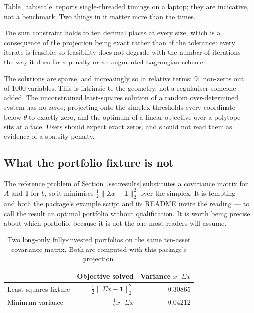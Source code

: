 \documentclass[11pt,a4paper]{article}
\begin{document}
Table~\ref{tab:scale} reports single-threaded timings on a laptop; they are
indicative, not a benchmark. Two things in it matter more than the times.

The sum constraint holds to ten decimal places at every size, which is a
consequence of the projection being exact rather than of the tolerance: every
iterate is feasible, so feasibility does not degrade with the number of
iterations the way it does for a penalty or an augmented-Lagrangian scheme.

The solutions are sparse, and increasingly so in relative terms: $91$ non-zeros
out of $1000$ variables. This is intrinsic to the geometry, not a regulariser
someone added. The unconstrained least-squares solution of a random
over-determined system has no zeros; projecting onto the simplex thresholds
every coordinate below $\theta$ to exactly zero, and the optimum of a linear
objective over a polytope sits at a face. Users should expect exact zeros, and
should not read them as evidence of a sparsity penalty.

\subsection{What the portfolio fixture is not}
\label{sec:notgmv}

The reference problem of Section~\ref{sec:results} substitutes a covariance
matrix for $A$ and $\mathbf{1}$ for $b$, so it minimises
$\tfrac{1}{2}\|\Sigma x - \mathbf{1}\|_2^2$ over the simplex. It is tempting ---
and both the package's example script and its README invite the reading --- to
call the result an optimal portfolio without qualification. It is worth being
precise about which portfolio, because it is not the one most readers will
assume.

\begin{table}[t]
\centering
\caption{Two long-only fully-invested portfolios on the same ten-asset
covariance matrix. Both are computed with this package's projection.}
\label{tab:gmv}
\begin{tabular}{lrr}
\toprule
& Objective solved & Variance $x^{\top}\Sigma x$ \\
\midrule
Least-squares fixture & $\tfrac{1}{2}\|\Sigma x - \mathbf{1}\|_2^2$ & $0.30865$ \\
Minimum variance      & $\tfrac{1}{2} x^{\top}\Sigma x$             & $0.04212$ \\
\bottomrule
\end{tabular}
\end{table}
\end{document}
